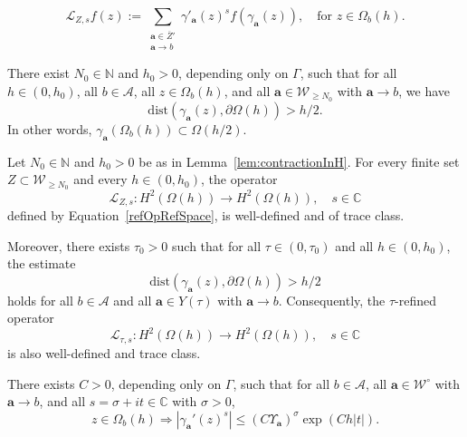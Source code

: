 \documentclass[10pt,a4paper]{amsart}
\newcommand{\Aa}{\textbf{a}}
\newcommand{\CC}{\mathbb{C}}
\begin{document}
\begin{equation}\label{refOpRefSpace}
\mathcal{L}_{Z,s}f(z) := \sum_{\substack{\Aa \in \overline{Z}' \\ \Aa \to b}} \gamma'_{\Aa}(z)^s f(\gamma_{\Aa}(z)), \quad \text{for } z \in \Omega_b(h).
\end{equation}

\begin{lemma}\label{lem:contractionInH}
There exist $N_0 \in \mathbb{N}$ and $h_0 > 0$, depending only on $\Gamma$, such that for all $h \in (0, h_0)$, all $b \in \mathcal{A}$, all $z \in \Omega_b(h)$, and all $\Aa \in \mathcal{W}_{\ge N_0}$ with $\Aa \to b$, we have
\[
\mathrm{dist}(\gamma_{\Aa}(z), \partial \Omega(h)) > h/2.
\]
In other words, $\gamma_{\Aa}(\Omega_b(h)) \subset \Omega(h/2)$.
\end{lemma}

\begin{lemma}\label{lem:welldefinedness}
Let $N_0 \in \mathbb{N}$ and $h_0 > 0$ be as in Lemma~\ref{lem:contractionInH}. For every finite set $Z \subset \mathcal{W}_{\ge N_0}$ and every $h \in (0, h_0)$, the operator
\begin{equation}\label{defi:refTOonRefS}
\mathcal{L}_{Z,s} \colon H^2(\Omega(h)) \to H^2(\Omega(h)), \quad s \in \CC
\end{equation}
defined by Equation~\eqref{refOpRefSpace}, is well-defined and of trace class.

Moreover, there exists $\tau_0 > 0$ such that for all $\tau \in (0, \tau_0)$ and all $h \in (0, h_0)$, the estimate
\[
\mathrm{dist}(\gamma_{\Aa}(z), \partial \Omega(h)) > h/2
\]
holds for all $b \in \mathcal{A}$ and all $\Aa \in Y(\tau)$ with $\Aa \to b$. Consequently, the $\tau$-refined operator
\begin{equation}\label{defi:refTOonRefS_2}
\mathcal{L}_{\tau,s} \colon H^2(\Omega(h)) \to H^2(\Omega(h)), \quad s \in \CC
\end{equation}
is also well-defined and trace class.
\end{lemma}

\begin{lemma}\label{lem:crucial_estimate}
There exists $C > 0$, depending only on $\Gamma$, such that for all $b \in \mathcal{A}$, all $\Aa \in \mathcal{W}^\circ$ with $\Aa \to b$, and all $s = \sigma + i t \in \CC$ with $\sigma > 0$,
\[
z \in \Omega_b(h) \Longrightarrow |\gamma_{\Aa}'(z)^s| \le (C \Upsilon_{\Aa})^{\sigma} \exp(C h |t|).
\]
\end{lemma}
\end{document}
